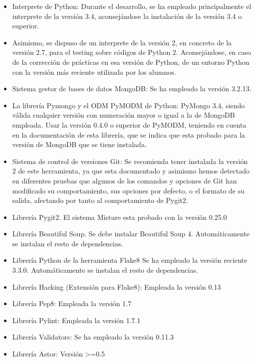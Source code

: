 \begin{itemize}
\item Interprete de Python:	Durante el desarrollo, se ha empleado principalmente el interprete de la versión 3.4, aconsejándose la instalación de la versión 3.4 o superior.

\item Asimismo, se dispuso de un interprete de la versión 2, en concreto de la versión 2.7, para el testing sobre códigos de Python 2. Aconsejándose, en caso de la corrección de prácticas en esa versión de Python, de un entorno Python con la versión más reciente utilizada por los alumnos.

\item Sistema gestor de bases de datos MongoDB: Se ha empleado la versión 3.2.13.

\item La librería Pymongo y el ODM PyMODM de Python: PyMongo 3.4, siendo válida cualquier versión con numeración mayor o igual a la de MongoDB empleada.
	Usar la versión 0.4.0 o superior de PyMODM, teniendo en cuenta en la documentación de esta librería, que se indica que esta probado para la versión de MongoDB que se tiene instalada.	

\item Sistema de control de versiones Git: Se recomienda tener instalada la versión 2 de este herramienta, ya que esta documentado y asimismo hemos detectado en diferentes pruebas que algunos de los comandos y opciones de Git han modificado su comportamiento, sus opciones por defecto, o el formato de su salida, afectando por tanto al comportamiento de Pygit2.

\item Librería Pygit2. El sistema Misture esta probado con la versión 0.25.0

\item Librería Beautiful Soup.
	Se debe instalar Beautiful Soup 4.
	Automáticamente se instalan el resto de dependencias.

\item Librería Python de la herramienta Flake8
	Se ha empleado la versión reciente 3.3.0.
	Automáticamente se instalan el resto de dependencias.
	
\item Librería Hacking (Extensión para Flake8): Empleada la versión 0.13

\item Librería Pep8: Empleada la versión 1.7

\item Librería Pylint: Empleada la versión 1.7.1

\item Librería Validators: Se ha empleado la versión 0.11.3

\item Librería Astor: Versión \textgreater=0.5
\end{itemize}
